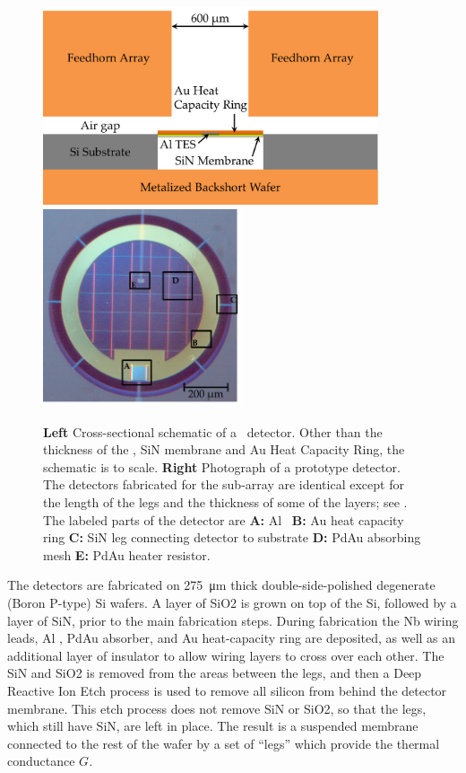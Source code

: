 \begin{figure}
\centering
\includegraphics[width=3.9in]{images/ch5-det-schematic.png}
\includegraphics[width=2.3in]{images/ch5-proto-pixel-labeled.png}
\caption[Detector cross-section and photograph]{
  \textbf{Left} Cross-sectional schematic of a \Imager\ detector.
  Other than the thickness of the \TES, SiN membrane and Au Heat Capacity Ring, the schematic is to scale.
  \textbf{Right} Photograph of a prototype detector.
  The detectors fabricated for the sub-array are identical except for the length of the legs and the thickness of some of the layers; see .
  The labeled parts of the detector are \textbf{A:} Al \TES\ \textbf{B:} Au heat capacity ring \textbf{C:} SiN leg connecting detector to substrate \textbf{D:} PdAu absorbing mesh \textbf{E:} PdAu heater resistor.
}
\label{fig:ch5-det-layout}
\end{figure}

The detectors are fabricated on \SI{275}{\um} thick double-side-polished degenerate (Boron P-type) Si wafers.
A layer of SiO2 is grown on top of the Si, followed by a layer of SiN, prior to the main fabrication steps.
During fabrication the Nb wiring leads, Al \TES, PdAu absorber, and Au heat-capacity ring are deposited, as well as an additional layer of insulator to allow wiring layers to cross over each other.
The SiN and SiO2 is removed from the areas between the legs, and then a Deep Reactive Ion Etch process is used to remove all silicon from behind the detector membrane.
This etch process does not remove SiN or SiO2, so that the legs, which still have SiN, are left in place.
The result is a suspended membrane connected to the rest of the wafer by a set of ``legs'' which provide the thermal conductance $G$.

